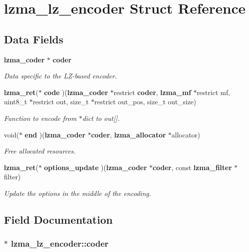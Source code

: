 \section{lzma\-\_\-lz\-\_\-encoder Struct Reference}
\label{structlzma__lz__encoder}
\subsection*{Data Fields}
\begin{DoxyCompactItemize}
\item 
{\bf lzma\-\_\-coder} $\ast$ {\bf coder}
\begin{DoxyCompactList}\small\item\em Data specific to the L\-Z-\/based encoder. \end{DoxyCompactList}\item 
{\bf lzma\-\_\-ret}($\ast$ {\bf code} )({\bf lzma\-\_\-coder} $\ast$restrict {\bf coder}, {\bf lzma\-\_\-mf} $\ast$restrict mf, uint8\-\_\-t $\ast$restrict out, size\-\_\-t $\ast$restrict out\-\_\-pos, size\-\_\-t out\-\_\-size)
\begin{DoxyCompactList}\small\item\em Function to encode from $\ast$dict to out[]. \end{DoxyCompactList}\item 
void($\ast$ {\bf end} )({\bf lzma\-\_\-coder} $\ast${\bf coder}, {\bf lzma\-\_\-allocator} $\ast$allocator)
\begin{DoxyCompactList}\small\item\em Free allocated resources. \end{DoxyCompactList}\item 
{\bf lzma\-\_\-ret}($\ast$ {\bf options\-\_\-update} )({\bf lzma\-\_\-coder} $\ast${\bf coder}, const {\bf lzma\-\_\-filter} $\ast$filter)
\begin{DoxyCompactList}\small\item\em Update the options in the middle of the encoding. \end{DoxyCompactList}\end{DoxyCompactItemize}


\subsection{Field Documentation}
\subsubsection[{coder}]{$\ast$ lzma\-\_\-lz\-\_\-encoder\-::coder}\label{structlzma__lz__encoder_a0867c0afde76be3dae25cd7be69434d6}


